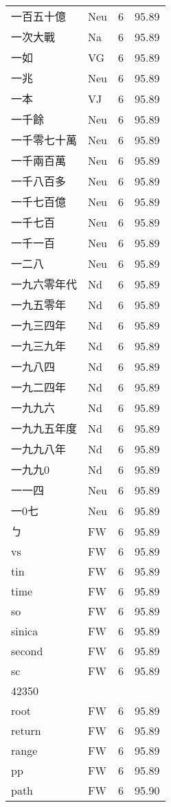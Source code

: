 \documentclass[twocolumn]{book}
\begin{document}
\begin{supertabular}{llrr}
一百五十億 & Neu & 6 &  95.89\\
一次大戰 & Na & 6 &  95.89\\
一如 & VG & 6 &  95.89\\
一兆 & Neu & 6 &  95.89\\
一本 & VJ & 6 &  95.89\\
一千餘 & Neu & 6 &  95.89\\
一千零七十萬 & Neu & 6 &  95.89\\
一千兩百萬 & Neu & 6 &  95.89\\
一千八百多 & Neu & 6 &  95.89\\
一千七百億 & Neu & 6 &  95.89\\
一千七百 & Neu & 6 &  95.89\\
一千一百 & Neu & 6 &  95.89\\
一二八 & Neu & 6 &  95.89\\
一九六零年代 & Nd & 6 &  95.89\\
一九五零年 & Nd & 6 &  95.89\\
一九三四年 & Nd & 6 &  95.89\\
一九三九年 & Nd & 6 &  95.89\\
一九八四 & Nd & 6 &  95.89\\
一九二四年 & Nd & 6 &  95.89\\
一九九六 & Nd & 6 &  95.89\\
一九九五年度 & Nd & 6 &  95.89\\
一九九八年 & Nd & 6 &  95.89\\
一九九0 & Nd & 6 &  95.89\\
一一四 & Neu & 6 &  95.89\\
一0七 & Neu & 6 &  95.89\\
ㄅ & FW & 6 &  95.89\\
vs & FW & 6 &  95.89\\
tin & FW & 6 &  95.89\\
time & FW & 6 &  95.89\\
so & FW & 6 &  95.89\\
sinica & FW & 6 &  95.89\\
second & FW & 6 &  95.89\\
sc & FW & 6 &  95.89\\
42350\\
root & FW & 6 &  95.89\\
return & FW & 6 &  95.89\\
range & FW & 6 &  95.89\\
pp & FW & 6 &  95.89\\
path & FW & 6 &  95.90\\

\end{supertabular}
\end{document}

